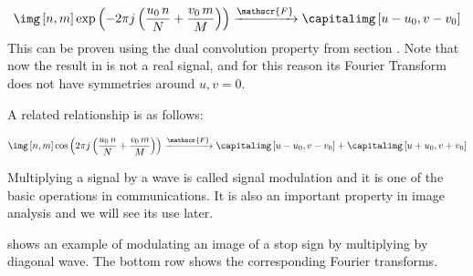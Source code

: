 
\begin{equation}
\img \left[n,m \right]  \exp{ \left( -2\pi j \left( \frac{u_0\, n}{N} + \frac{v_0\, m}{M} \right) \right)}\xrightarrow{\mathscr{F}} 
\capitalimg \left[u-u_0,v-v_0 \right]
\label{eq:modulation_exp}
\end{equation}
This can be proven using the dual convolution property from section \sect{\ref{section:dualconv}}.
Note that now the result in \eqn{\ref{eq:modulation_exp}} is not a real signal, and for this reason its Fourier Transform does not have symmetries around $u,v=0$. 

A related relationship is as follows: 

\begin{equation}
\img \left[n,m \right]  \cos{ \left( 2\pi j \left( \frac{u_0\, n}{N} + \frac{v_0\, m}{M} \right) \right)}
\xrightarrow{\mathscr{F}} 
\capitalimg \left[u-u_0,v-v_0 \right] + \capitalimg \left[u+u_0,v+v_0 \right] 
\end{equation}

Multiplying a signal by a wave is called signal modulation and it is one of the basic operations in communications. It is also an important property in image analysis and we will see its use later. 

\Fig{\ref{fig:modulation}} shows an example of modulating an image of a stop sign by multiplying by diagonal wave. The bottom row shows the corresponding Fourier transforms.



